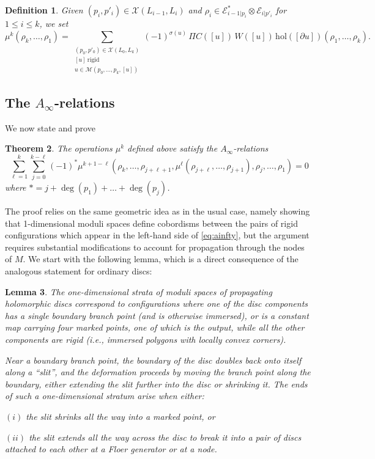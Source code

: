 \documentclass[11pt,leqno]{amsart}
\newtheorem{theo}{Theorem}[section]
\newtheorem{lemma}[theo]{Lemma}
\newtheorem{defi}[theo]{Definition}
\numberwithin{equation}{section}
\newcommand{\cM}{{\mathcal M}}
\newcommand{\cE}{{\mathcal E}}
\newcommand{\cX}{{\mathcal X}}
\begin{document}
\begin{defi} Given $(p_i,p'_i)\in \cX(L_{i-1},L_i)$ and
$\rho_i\in \cE_{i-1|p_i}^*\otimes \cE_{i|p'_i}$ for $1\leq i\leq k$, we set
$$\mu^k(\rho_k,\dots,\rho_1)=\sum_{\substack{
(p_0,p'_0)\in \cX(L_0,L_k)\\[2pt] [u]\ \text{rigid}\\[1pt]
u\in \cM(p_0,\dots,p_k,[u])}} 
(-1)^{\sigma(u)}\,\Pi C([u])\,W([u])\,\mathrm{hol}([\partial u])(\rho_1,\dots,\rho_k).$$
\end{defi}

\subsection{The $A_\infty$-relations} We now state and prove
\begin{theo}\label{thm:ainfty}
The operations $\mu^k$ defined above satisfy the 
$A_\infty$-relations 
\begin{equation}\label{eq:ainfty}
\sum_{\ell=1}^{k}\sum_{j=0}^{k-\ell} (-1)^* \mu^{k+1-\ell}(\rho_k,\dots,
\rho_{j+\ell+1},\mu^\ell(\rho_{j+\ell},\dots,\rho_{j+1}),\rho_j,\dots,\rho_1)=0
\end{equation}
where $*=j+\deg(p_1)+\dots+\deg(p_j)$.
\end{theo}
The proof relies on the same geometric idea as
in the usual case, namely showing that 1-dimensional moduli spaces define
cobordisms between the pairs of rigid configurations which appear in the 
left-hand side of \eqref{eq:ainfty}, but the argument requires substantial modifications
to account for propagation through the nodes of $M$.
We start with the following lemma, which is a direct consequence of the analogous statement for ordinary discs:

\begin{lemma}\label{l:localslit}
The one-dimensional strata of moduli spaces of propagating holomorphic discs 
correspond to configurations where one of the disc components has a single
boundary branch point (and is otherwise immersed), or is a constant map carrying four marked points, one
of which is the output, while all the other components are rigid
(i.e., immersed polygons with locally convex corners).

Near a boundary branch point, the boundary of the disc
doubles back onto itself along a ``slit'',
and the deformation proceeds by moving the
branch point along the boundary, either extending the
slit further into the disc or shrinking it. The ends of such a one-dimensional
stratum arise when either:

$(i)$ the slit shrinks all the way into a marked point, or 

$(ii)$ the slit extends all the way across the disc to break it into a pair of
discs attached to each other at a Floer generator or at a node.

\end{lemma}
\end{document}
